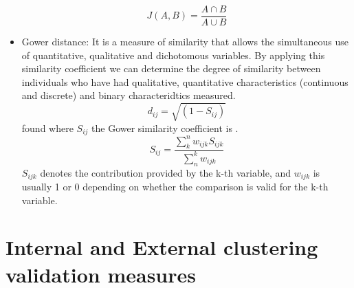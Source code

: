 \begin{itemize}
    \begin{equation}
        J(A,B) = \frac{A \cap B}{A \cup B}
    \end{equation}
    \item Gower distance: It is a measure of similarity that allows the simultaneous use of quantitative, qualitative and dichotomous variables. By applying this similarity coefficient we can determine the degree of similarity between individuals who have had qualitative, quantitative characteristics (continuous and discrete) and binary characteridtics measured.
    \begin{equation}
        d_{ij}=\sqrt{(1-S_{ij})}
    \end{equation}
    found where $S_{ij}$ the Gower similarity coefficient is \citep{b62}.
    \begin{equation}
        S_{ij}=\frac{\sum_{k}^{n}w_{ijk}S_{ijk}}{\sum_{n}^{k}w_{ijk}}
    \end{equation}
    $S_{ijk}$ denotes the contribution provided by the k-th variable, and $w_{ijk}$ is usually 1 or 0 depending on whether the comparison is valid for the k-th variable.
\end{itemize}

\section {Internal and External clustering validation measures} \label{sec:seccion2}

